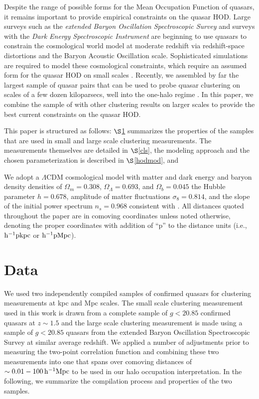 \documentclass[useAMS,usenatbib]{mn2e}
\begin{document}
Despite the range of possible forms for the Mean Occupation Function of quasars, it remains important to provide empirical 
constraints on the quasar HOD. Large surveys such as the {\em extended Baryon Oscillation Spectroscopic Survey} 
\citep{my15,daw16} and surveys with the {\em Dark Energy Spectroscopic Instrument} \citep{DESI1,DESI2} are beginning to use 
quasars to constrain the cosmological world model at moderate redshift via redshift-space distortions and the Baryon 
Acoustic Oscillation scale. Sophisticated simulations are required to model these cosmological constraints, which require 
an assumed form for the quasar HOD on small scales \citep[e.g.][]{rod17}. Recently, we assembled by far the largest sample of 
quasar pairs that can be used to probe quasar clustering on scales of a few dozen kiloparsecs, well into the one-halo 
regime \citep[][]{ef17}. In this paper, we combine the sample of \citet{ef17} with other clustering results on larger 
scales \citep[e.g.][]{ko12,la17} to provide the best current constraints on the quasar HOD.




This paper is structured as follows: $\S$\ref{dat} summarizes the properties of 
the samples that are used in small and large scale clustering measurements. The measurements 
themselves are detailed in $\S$\ref{cls}, the modeling approach and the chosen 
parameterization is described in $\S$\ref{hodmod}, and 

We adopt a $\Lambda$CDM cosmological model 
with matter and dark energy and baryon density densities of $\Omega_{m}=0.308$, 
$\Omega_{\Lambda}=0.693$, and $\Omega_{b}=0.045$ the Hubble parameter $h=0.678$, 
amplitude of matter fluctuations $\sigma_{8}=0.814$, and the slope of the 
initial power spectrum $n_s=0.968$ consistent with 
\citet{planck15}. All distances quoted throughout the paper are in comoving 
coordinates unless noted otherwise, denoting the proper coordinates with addition of ``p'' to the distance units (i.e., $ \rm h^{-1}pkpc$ or $ \rm h^{-1}pMpc$). 



\section{Data}\label{dat}
 We used two independently compiled samples of confirmed quasars for clustering 
measurements at kpc and Mpc scales. The small scale clustering measurement used in this work is drawn from a complete sample of 
$g<20.85$ confirmed quasars at $z \sim 1.5$ and the large scale clustering measurement is 
made using a sample of $g<20.85$ quasars from the extended Baryon 
Oscillation Spectroscopic Survey \citep[eBOSS;][]{daw16} at similar average redshift. We applied a number of adjustments prior to measuring the two-point correlation function and combining these two measurements into one that spans over comoving distances of $\sim 0.01-100 \, \rm h^{-1}Mpc$ to be used in our halo occupation interpretation. In the following, we summarize the compilation process and properties of the two samples.
\end{document}
